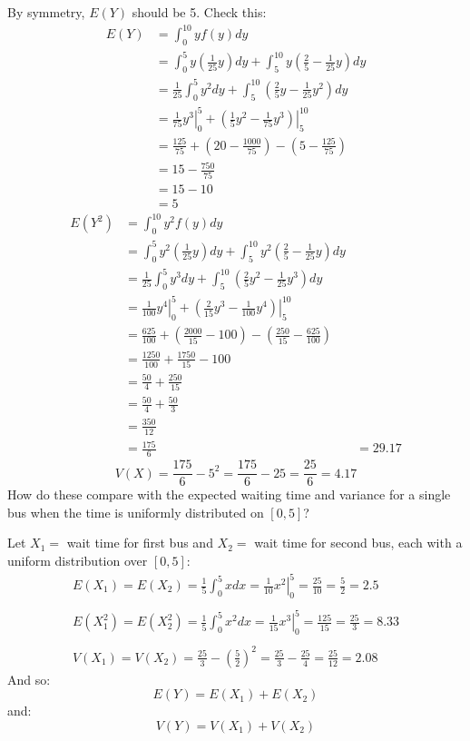 \documentclass[letterpaper,12pt,fleqn]{article}
\begin{document}
\begin{enumerate}[label={\alph*)}]
  By symmetry, \(E(Y)\) should be 5.  Check this:
  \begin{align*}
    E(Y) &= \int_0^{10}yf(y)dy \\
    &= \int_0^5y\left(\frac{1}{25}y\right)dy+\int_5^{10}y\left(\frac{2}{5}-\frac{1}{25}y\right)dy \\
    &= \frac{1}{25}\int_0^5y^2dy+\int_5^{10}\left(\frac{2}{5}y-\frac{1}{25}y^2\right)dy \\
    &= \left.\frac{1}{75}y^3\right|_0^5+\left.\left(\frac{1}{5}y^2-\frac{1}{75}y^3\right)\right|_5^{10} \\
    &= \frac{125}{75}+\left(20-\frac{1000}{75}\right)-\left(5-\frac{125}{75}\right) \\
    &= 15-\frac{750}{75} \\
    &= 15-10 \\
    &= 5
  \end{align*}
  \begin{align*}
    E(Y^2) &= \int_0^{10}y^2f(y)dy \\
    &= \int_0^5y^2\left(\frac{1}{25}y\right)dy+\int_5^{10}y^2\left(\frac{2}{5}-\frac{1}{25}y\right)dy \\
    &= \frac{1}{25}\int_0^5y^3dy+\int_5^{10}\left(\frac{2}{5}y^2-\frac{1}{25}y^3\right)dy \\
    &= \left.\frac{1}{100}y^4\right|_0^5+\left.\left(\frac{2}{15}y^3-\frac{1}{100}y^4\right)\right|_5^{10} \\
    &= \frac{625}{100}+\left(\frac{2000}{15}-100\right)-\left(\frac{250}{15}-\frac{625}{100}\right) \\
    &= \frac{1250}{100}+\frac{1750}{15}-100 \\
    &= \frac{50}{4}+\frac{250}{15} \\
    &= \frac{50}{4}+\frac{50}{3} \\
    &= \frac{350}{12} \\
    &= \frac{175}{6}
    &= 29.17
  \end{align*}
  \[V(X)=\frac{175}{6}-5^2=\frac{175}{6}-25=\frac{25}{6}=4.17\]
  How do these compare with the expected waiting time and variance for a single bus when the time is uniformly distributed on
  \([0,5]\)?

  Let \(X_1=\) wait time for first bus and \(X_2=\) wait time for second bus, each with a uniform distribution over
  \([0,5]\):
  \begin{gather*}
    E(X_1)=E(X_2)=\frac{1}{5}\int_0^5xdx=\left.\frac{1}{10}x^2\right|_0^5=\frac{25}{10}=\frac{5}{2}=2.5 \\
    \\
    E(X_1^2)=E(X_2^2)=\frac{1}{5}\int_0^5x^2dx=\left.\frac{1}{15}x^3\right|_0^5=\frac{125}{15}=\frac{25}{3}=8.33 \\
    \\
    V(X_1)=V(X_2)=\frac{25}{3}-\left(\frac{5}{2}\right)^2=\frac{25}{3}-\frac{25}{4}=\frac{25}{12}=2.08
  \end{gather*}
  And so:
  \[E(Y)=E(X_1)+E(X_2)\]
  and:
  \[V(Y)=V(X_1)+V(X_2)\]
\end{enumerate}
\end{document}
